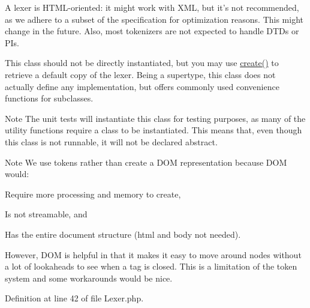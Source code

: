 A lexer is H\+T\+M\+L-\/oriented\+: it might work with X\+M\+L, but it's not recommended, as we adhere to a subset of the specification for optimization reasons. This might change in the future. Also, most tokenizers are not expected to handle D\+T\+Ds or P\+Is.

This class should not be directly instantiated, but you may use \hyperlink{classHTMLPurifier__Lexer_ac7f8fe627b8b6a4d0e08dcf893c15a9f}{create()} to retrieve a default copy of the lexer. Being a supertype, this class does not actually define any implementation, but offers commonly used convenience functions for subclasses.

\begin{DoxyNote}{Note}
The unit tests will instantiate this class for testing purposes, as many of the utility functions require a class to be instantiated. This means that, even though this class is not runnable, it will not be declared abstract.
\end{DoxyNote}
\begin{DoxyParagraph}{}

\end{DoxyParagraph}
\begin{DoxyNote}{Note}
We use tokens rather than create a D\+O\+M representation because D\+O\+M would\+:
\end{DoxyNote}
\begin{DoxyParagraph}{}

\begin{DoxyEnumerate}
\item Require more processing and memory to create,
\item Is not streamable, and
\item Has the entire document structure (html and body not needed).
\end{DoxyEnumerate}
\end{DoxyParagraph}
\begin{DoxyParagraph}{}
However, D\+O\+M is helpful in that it makes it easy to move around nodes without a lot of lookaheads to see when a tag is closed. This is a limitation of the token system and some workarounds would be nice. 
\end{DoxyParagraph}


Definition at line 42 of file Lexer.\+php.



